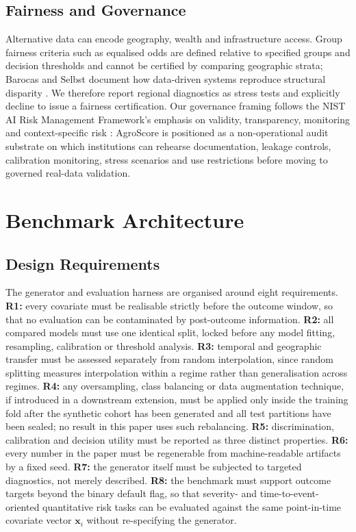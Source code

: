 \documentclass[journal]{IEEEtran}
\begin{document}
\subsection{Fairness and Governance}
Alternative data can encode geography, wealth and infrastructure access. Group fairness criteria such as equalised odds are defined relative to specified groups and decision thresholds \cite{hardt2016equality} and cannot be certified by comparing geographic strata; Barocas and Selbst document how data-driven systems reproduce structural disparity \cite{barocas2016impact}. We therefore report regional diagnostics as stress tests and explicitly decline to issue a fairness certification. Our governance framing follows the NIST AI Risk Management Framework's emphasis on validity, transparency, monitoring and context-specific risk \cite{nist2023airmf}: AgroScore is positioned as a non-operational audit substrate on which institutions can rehearse documentation, leakage controls, calibration monitoring, stress scenarios and use restrictions before moving to governed real-data validation.

\section{Benchmark Architecture}
\label{sec:architecture}

\subsection{Design Requirements}
The generator and evaluation harness are organised around eight requirements. \textbf{R1:} every covariate must be realisable strictly before the outcome window, so that no evaluation can be contaminated by post-outcome information. \textbf{R2:} all compared models must use one identical split, locked before any model fitting, resampling, calibration or threshold analysis. \textbf{R3:} temporal and geographic transfer must be assessed separately from random interpolation, since random splitting measures interpolation within a regime rather than generalisation across regimes. \textbf{R4:} any oversampling, class balancing or data augmentation technique, if introduced in a downstream extension, must be applied only inside the training fold after the synthetic cohort has been generated and all test partitions have been sealed; no result in this paper uses such rebalancing. \textbf{R5:} discrimination, calibration and decision utility must be reported as three distinct properties. \textbf{R6:} every number in the paper must be regenerable from machine-readable artifacts by a fixed seed. \textbf{R7:} the generator itself must be subjected to targeted diagnostics, not merely described. \textbf{R8:} the benchmark must support outcome targets beyond the binary default flag, so that severity- and time-to-event-oriented quantitative risk tasks can be evaluated against the same point-in-time covariate vector $\mathbf{x}_i$ without re-specifying the generator.
\end{document}
